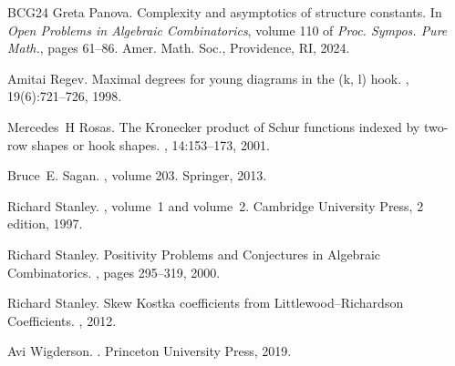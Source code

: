 \documentclass[11pt]{amsart}
\theoremstyle{plain}
\theoremstyle{definition}
\numberwithin{equation}{section}
\begin{document}
\begin{thebibliography}{BCG{\etalchar{+}}24}
Greta Panova.
\newblock Complexity and asymptotics of structure constants.
\newblock In {\em Open Problems in Algebraic Combinatorics}, volume 110 of {\em
  Proc. Sympos. Pure Math.}, pages 61--86. Amer. Math. Soc., Providence, RI,
  2024.

Amitai Regev.
\newblock Maximal degrees for young diagrams in the (k, l) hook.
, 19(6):721--726, 1998.

Mercedes~H Rosas.
\newblock The {K}ronecker product of {S}chur functions indexed by two-row
  shapes or hook shapes.
, 14:153--173, 2001.

Bruce~E. Sagan.
, volume 203.
\newblock Springer, 2013.

Richard Stanley.
, volume~1 and volume~2.
\newblock Cambridge University Press, 2 edition, 1997.

Richard Stanley.
\newblock Positivity {P}roblems and {C}onjectures in {A}lgebraic
  {C}ombinatorics.
, pages 295--319, 2000.

Richard Stanley.
\newblock Skew {K}ostka coefficients from {L}ittlewood--{R}ichardson Coefficients.
, 2012.

Avi Wigderson.
.
\newblock Princeton University Press, 2019.

\end{thebibliography}
\end{document}
